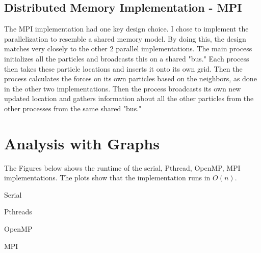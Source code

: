 \documentclass[12pt,a4paper]{article}
\begin{document}
\subsection{Distributed Memory Implementation -  MPI}

The MPI implementation had one key design choice. I chose to implement the parallelization to resemble a shared memory model. By doing this, the design matches very closely to the other 2 parallel implementations. The main process initializes all the particles and broadcasts this on a shared "bus." Each process then takes these particle locations and inserts it onto its own grid. Then the process calculates the forces on its own particles based on the neighbors, as done in the other two implementations. Then the process broadcasts its own new updated location and gathers information about all the other particles from the other processes from the same shared "bus."

\section{Analysis with Graphs}

The Figures below shows the runtime of the serial, Pthread, OpenMP, MPI implementations. The plots show that the implementation runs in $O(n)$. 

\quad Serial

\quad Pthreads

\quad OpenMP

\quad MPI


\end{document}
